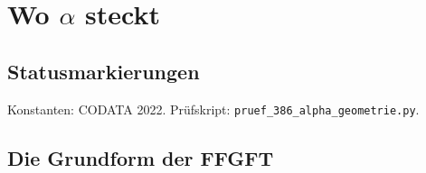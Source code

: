 
\providecommand{\BM}{\textbf{[B]}}
\providecommand{\KM}{\textbf{[K]}}
\providecommand{\SM}{\textbf{[S]}}
\providecommand{\XM}{\textbf{[X]}}
\providecommand{\QM}{\textbf{[Q]}}

\chapter*{Wo \texorpdfstring{$\alpha$}{alpha} steckt}

\begin{abstract}
Die FFGFT ist in erster Linie eine verhältnisbasierte Theorie. Sie rechnet in natürlichen
Einheiten mit der Konvention $\alpha=1$ und einer entsprechend umdefinierten Ladung; in dieser
Grundform kommt sie ohne fraktale Korrektur aus. Dieses Dokument zeigt, dass dabei nichts
verloren geht und die Geometrie sichtbar wird. Mit $\hbar=c=\varepsilon_0=1$ gilt $e^2=4\pi\alpha$;
mit $\alpha=1$ wird $e=\sqrt{4\pi}$, die Ladung wird über die volle Kugeloberfläche gemessen.
$\alpha$ wandert in die Ladungseinheit und ist das Verhältnis zweier Kugeln um jedes geladene
Teilchen, $\alpha=r_e/\lambda_C$; mit $\alpha=1$ fallen Coulomb-Kugel, Compton-Kugel und
Bohr-Radius zu einer Skala zusammen. Die FFGFT-Brücke lautet in der Grundform $\xi E_0^2=1$ mit
$E_0^2=m_em_\mu$. Das hat eine unmittelbare geometrische Lesart: $\xi$ ist das Produkt der
Compton-Radien von Elektron und Myon, $\xi=\lambda_e\lambda_\mu$, eine Fläche. Die Zahl
$1/\xi=7500=100\cdot75$ ist dieselbe, die die Rekursion trägt, mit Startwert $\xi_0=1/7500$ und
Rotationszahl $74/75$. Erst die Übersetzung in SI braucht eine Bezugsenergie, das MeV, und dort,
und nur dort, tritt die fraktale Korrektur auf.
\end{abstract}

\section*{Statusmarkierungen}

Konstanten: CODATA 2022. Prüfskript: \texttt{pruef\_386\_alpha\_geometrie.py}.

\section{Die Grundform der FFGFT}

